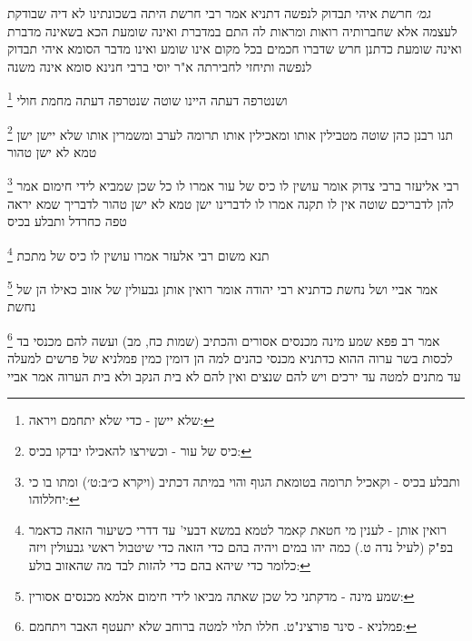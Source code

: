 \documentclass[12pt, openany]{book}
\newcommand{\footnotecomment}[1]{
	\renewcommand\thefootnote{}
	\footnote{#1}}
\newcommand{\commenta}[1]{\footnotecomment{#1}}
\begin{document}
{{\large\emph{גמ׳}} חרשת איהי תבדוק לנפשה דתניא אמר רבי חרשת היתה בשכונתינו לא דיה שבודקת לעצמה אלא שחברותיה רואות ומראות לה 
התם במדברת ואינה שומעת הכא בשאינה מדברת ואינה שומעת כדתנן חרש שדברו חכמים בכל מקום אינו שומע ואינו מדבר
הסומא איהי תבדוק לנפשה ותיחזי לחבירתה א"ר יוסי ברבי חנינא סומא אינה משנה
\commenta{שלא יישן - כדי שלא יתחמם ויראה:}
ושנטרפה דעתה היינו שוטה שנטרפה דעתה מחמת חולי 
\commenta{כיס של עור - וכשירצו להאכילו יבדקו בכיס:}
תנו רבנן כהן שוטה מטבילין אותו ומאכילין אותו תרומה לערב ומשמרין אותו שלא יישן ישן טמא לא ישן טהור 
\commenta{ותבלע בכיס - וקאכיל תרומה בטומאת הגוף והוי במיתה דכתיב (ויקרא כ״ב:ט׳) ומתו בו כי יחללוהו:}
רבי אליעזר ברבי צדוק אומר עושין לו כיס של עור אמרו לו כל שכן שמביא לידי חימום אמר להן לדבריכם שוטה אין לו תקנה 
אמרו לו לדברינו ישן טמא לא ישן טהור לדבריך שמא יראה טפה כחרדל ותבלע בכיס 
\commenta{רואין אותן - לענין מי חטאת קאמר לטמא במשא דבעי' עד דדרי כשיעור הזאה כדאמר בפ"ק (לעיל נדה ט.) כמה יהו במים ויהיה בהם כדי הזאה כדי שיטבול ראשי גבעולין ויזה כלומר כדי שיהא בהם כדי להזות לבד מה שהאזוב בולע:}
תנא משום רבי אלעזר אמרו עושין לו כיס של מתכת 
\commenta{שמע מינה - מדקתני כל שכן שאתה מביאו לידי חימום אלמא מכנסים אסורין:}
אמר אביי ושל נחשת כדתניא רבי יהודה אומר רואין אותן גבעולין של אזוב כאילו הן של נחשת 
\commenta{פמלניא - סינר פורצינ"ט. חללו תלוי למטה ברוחב שלא יתעטף האבר ויתחמם:}
אמר רב פפא שמע מינה מכנסים אסורים והכתיב (שמות כח, מב) ועשה להם מכנסי בד לכסות בשר ערוה 
ההוא כדתניא מכנסי כהנים למה הן דומין כמין פמלניא של פרשים למעלה עד מתנים למטה עד ירכים ויש להם שנצים ואין להם לא בית הנקב ולא בית הערוה 
אמר אביי
\clearpage}
\end{document}
